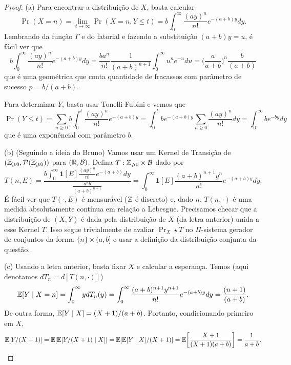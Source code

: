 \begin{proof}
	(a) Para encontrar a distribuição de $X$, basta calcular
	\[
		\Pr(X = n) = \lim_{t \to \infty} \Pr(X = n, Y \leq t) = b
		\int_{0}^\infty \frac{(ay)^n}{n!}e^{-(a+b)y}dy.
	\]
	Lembrando da função $\Gamma$ e do fatorial e fazendo a substituição
	$(a+b)y = u$, é fácil ver que
	\[
		b \int_{0}^\infty \frac{(ay)^n}{n!}e^{-(a+b)y} dy =
		\frac{ba^n}{n!}\frac{1}{(a + b)^{n+1}} \int_0^\infty u^n e^{-u} du
		= \bigg(\frac{a}{a + b}\bigg)^n \frac{b}{(a + b)}
	\]
	que é uma geométrica que conta quantidade de fracassos com parâmetro
	de sucesso $p = b/(a+b)$.

	Para determinar $Y$, basta usar Tonelli-Fubini e vemos que
	\[
		\Pr(Y \leq t) = \sum_{n \geq 0} b\int_0^t
		\frac{(ay)^n}{n!}e^{-(a+b)y} = \int_0^t be^{-(a+b)y} \sum_{n \geq
		0} \frac{(ay)^n}{n!} dy = \int_0^\infty be^{-by}dy
	\]
	que é uma exponêncial com parâmetro $b$.

	(b)
	(Seguindo a ideia do Bruno) Vamos usar um Kernel de Transição de
	$(\mathbb{Z}_{\geqslant 0}, \mathcal{P}(\mathbb{Z}_{\geqslant 0}))$ para
	$(\mathbb{R}, \mathcal{B})$. Defina
	$T : \mathbb{Z}_{\geqslant 0} \times \mathcal{B}$ dado por
	\[
		T(n, E) = \frac{b\int_0^\infty \bm{1}[E] \frac{(ay)^n}{n!}
		e^{-(a+b)}dy}{\frac{a^nb}{(a + b)^{n+1}}}
		= \int_0^\infty \bm{1}[E]\frac{(a + b)^{n+1}y^n}{n!}e^{-(a + b)y}dy.
	\]
	É fácil ver que $T(\cdot, E)$ é mensurável ($\mathbb{Z}$ é discreto) e, dado
	$n$, $T(n, \cdot)$ é uma medida absolutamente contínua em relação a Lebesgue.
	Precisamos checar que a distribuição de $(X,Y)$ é dada pela
	distribuição de $X$ (da letra anterior) unida a esse Kernel $T$.
	Isso segue trivialmente de avaliar $\Pr_X \star T$ no $\Pi$-sistema
	gerador de conjuntos da forma $\{n\} \times (a,b]$ e usar a
	definição da distribuição conjunta da questão.

	(c) Usando a letra anterior, basta fixar $X$ e calcular a esperança.
	Temos (aqui denotamos $dT_n = d[T(n, \cdot)]$)
	\[
		\mathbb{E} [Y \mid X = n] = \int_{0}^\infty y dT_n(y) = \int_0^\infty
		\frac{(a + b)^{n+1}y^{n+1}}{n!} e^{-(a+b)y}dy = \frac{(n+1)}{(a+b)}.
	\]
	De outra forma, $\mathbb{E}[Y \mid X] = (X+1)/(a+b)$. Portanto,
	condicionando primeiro em $X$,
	\[
		\mathbb{E}[Y/(X+1)] = \mathbb{E}[ \mathbb{E}[Y/(X+1) \mid X]] = \mathbb{E}[ \mathbb{E}[Y \mid
		X]/(X+1)] = \mathbb{E}\bigg[\frac{X+1}{(X+1)(a+b)}\bigg] = \frac{1}{a+b}.
	\]


\end{proof}
